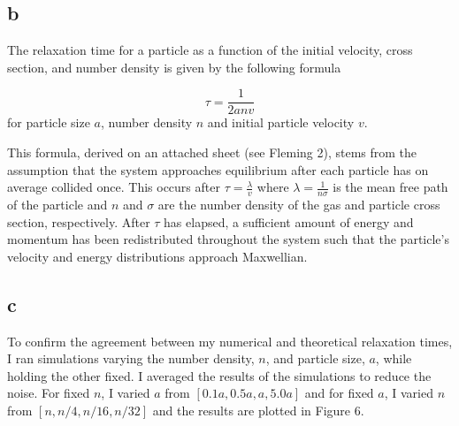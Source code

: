 \documentclass[12pt]{amsart}
\begin{document}
\subsection{b}

The relaxation time for a particle as a function of the initial velocity, cross section, and number density is given by the following formula

$$ \tau = \frac{1}{2anv} $$
\newline
for particle size $a$, number density $n$ and initial particle velocity $v$.
\newline
\par This formula, derived on an attached sheet (see Fleming 2), stems from the assumption that the system approaches equilibrium after each particle has on average collided once.  This occurs after $\tau = \frac{\lambda}{v}$ where $\lambda = \frac{1}{n\sigma}$ is the mean free path of the particle and $n$ and $\sigma$ are the number density of the gas and particle cross section, respectively.  After $\tau$ has elapsed, a sufficient amount of energy and momentum has been redistributed throughout the system such that the particle's velocity and energy distributions approach Maxwellian.  

\subsection{c}

To confirm the agreement between my numerical and theoretical relaxation times, I ran simulations varying the number density, $n$, and particle size, $a$, while holding the other fixed.  I averaged the results of the simulations to reduce the noise.  For fixed $n$, I varied $a$ from $[0.1a,0.5a,a,5.0a]$ and for fixed $a$, I varied $n$ from $[n,n/4,n/16,n/32]$ and the results are plotted in Figure 6.
\end{document}

